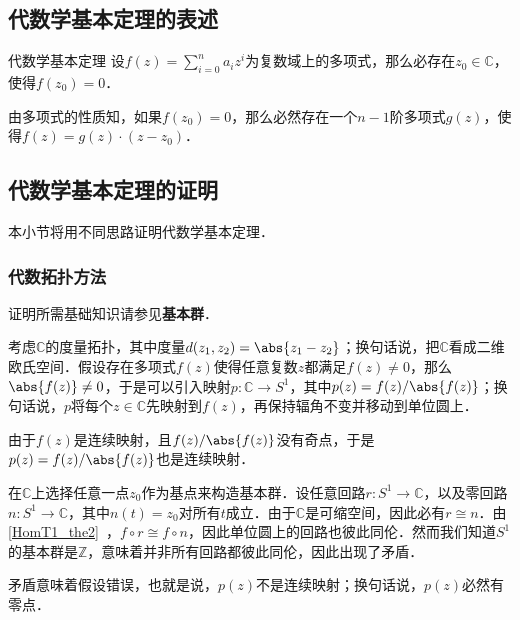 

\subsection{代数学基本定理的表述}

\begin{definition}{代数学基本定理}
设$f(z)=\sum\limits_{i=0}^n a_iz^i$为复数域上的多项式，那么必存在$z_0\in\mathbb{C}$，使得$f(z_0)=0$．
\end{definition}

由多项式的性质知，如果$f(z_0)=0$，那么必然存在一个$n-1$阶多项式$g(z)$，使得$f(z)=g(z)\cdot(z-z_0)$．

\subsection{代数学基本定理的证明}

本小节将用不同思路证明代数学基本定理．

\subsubsection{代数拓扑方法}
证明所需基础知识请参见\textbf{基本群}．

考虑$\mathbb{C}$的度量拓扑，其中度量$d(z_1, z_2)=\abs{z_1-z_2}$；换句话说，把$\mathbb{C}$看成二维欧氏空间．假设存在多项式$f(z)$使得任意复数$z$都满足$f(z)\not=0$，那么$\abs{f(z)}\not=0$，于是可以引入映射$p:\mathbb{C}\rightarrow S^1$，其中$p(z)=f(z)/\abs{f(z)}$；换句话说，$p$将每个$z\in\mathbb{C}$先映射到$f(z)$，再保持辐角不变并移动到单位圆上．

由于$f(z)$是连续映射，且$f(z)/\abs{f(z)}$没有奇点，于是$p(z)=f(z)/\abs{f(z)}$也是连续映射．

在$\mathbb{C}$上选择任意一点$z_0$作为基点来构造基本群．设任意回路$r:S^1\rightarrow\mathbb{C}$，以及零回路$n:S^1\rightarrow\mathbb{C}$，其中$n(t)=z_0$对所有$t$成立．由于$\mathbb{C}$是可缩空间，因此必有$r\cong n$．由\autoref{HomT1_the2}~，$f\circ r\cong f\circ n$，因此单位圆上的回路也彼此同伦．然而我们知道$S^1$的基本群是$\mathbb{Z}$，意味着并非所有回路都彼此同伦，因此出现了矛盾．

矛盾意味着假设错误，也就是说，$p(z)$不是连续映射；换句话说，$p(z)$必然有零点．


